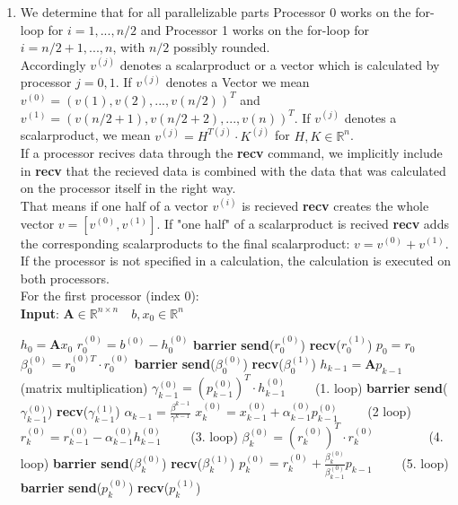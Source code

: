 \documentclass{article}
\begin{document}
\begin{enumerate}[label=(\alph*)]
\item
We determine that for all parallelizable parts Processor 0 works on the for-loop for $i = 1,...,n/2$ and Processor 1 works on the for-loop for $i = n/2+1,...,n$, with $n/2$ possibly rounded.\\
Accordingly $v^{(j)}$ denotes a scalarproduct or a vector which is calculated by processor $j = 0, 1$. 
If $v^{(j)}$ denotes a Vector we mean $v^{(0)} = (v(1), v(2), ..., v(n/2))^T$ and $v^{(1)} = (v(n/2+1), v(n/2+2), ..., v(n))^T$.
If $v^{(j)}$ denotes a scalarproduct, we mean $v^{(j)} = H^{T(j)} \cdot K^{(j)}$ for $H, K \in \mathbb{R}^n$.\\
If a processor recives data through the \textbf{recv} command, we implicitly include in \textbf{recv} that the recieved data is combined with the data that was calculated on the processor itself in the right way. \\
That means if one half of a vector $v^{(i)}$ is recieved \textbf{recv} creates the whole vector $v=[v^{(0)}, v^{(1)}]$. If "one half" of a scalarproduct is recived \textbf{recv} adds the corresponding scalarproducts to the final scalarproduct:  $v=v^{(0)}+ v^{(1)}$.
If the processor is not specified in a calculation, the calculation is executed on both processors.
\\
For the first processor (index 0):
\\
   \textbf{Input}: $ \textbf{A} \in \mathbb{R}^{n\times n} \quad b, x_0\in \mathbb{R}^n$
    \begin{algorithmic}[1]
	\State $h_{0} = \textbf{A}x_{0}$ 
	\State $r^{(0)}_0 = b^{(0)} - h_0^{(0)}$
	\State \textbf{barrier}
	\State \textbf{send}($r_0^{(0)}$)
	\State \textbf{recv}($r_0^{(1)}$)
	\State $p_0 = r_0$
	\State $\beta_0^{(0)} = r^{(0)T}_0\cdot r^{(0)}_0$
		\State \textbf{barrier}
	\State \textbf{send}($\beta_0^{(0)}$)
	\State \textbf{recv}($\beta_0^{(1)}$)
	\State $h_{k-1} = \textbf{A}p_{k-1}\qquad$ (matrix multiplication)
	\State $\gamma^{(0)}_{k-1} = (p^{(0)}_{k-1})^T\cdot h^{(0)}_{k-1}\qquad$ (1. loop)
			\State \textbf{barrier}
	\State \textbf{send}($\gamma_{k-1}^{(0)}$)
	\State \textbf{recv}($\gamma_{k-1}^{(1)}$)
	\State $\alpha_{k-1} = \frac{\beta^{k-1}}{\gamma^{k-1}}$
	\State $x^{(0)}_k = x^{(0)}_{k-1} + \alpha^{(0)}_{k-1}p^{(0)}_{k-1}\qquad$ (2 loop)
	\State $r^{(0)}_k = r^{(0)}_{k-1} - \alpha^{(0)}_{k-1}h^{(0)}_{k-1}\qquad$ (3. loop)
	\State $\beta^{(0)}_k = (r^{(0)}_k)^T\cdot r^{(0)}_k\qquad \qquad $ (4. loop)
				\State \textbf{barrier}
	\State \textbf{send}($\beta_k^{(0)}$)
	\State \textbf{recv}($\beta_k^{(1)}$)
	\State $p^{(0)}_k = r^{(0)}_{k} + \frac{\beta^{(0)}_k}{\beta^{(0)}_{k-1}}p_{k-1}\qquad$ (5. loop)
					\State \textbf{barrier}
	\State \textbf{send}($p_k^{(0)}$)
	\State \textbf{recv}($p_k^{(1)}$)
	\EndFor
    \end{algorithmic}


\end{enumerate}
\end{document}
